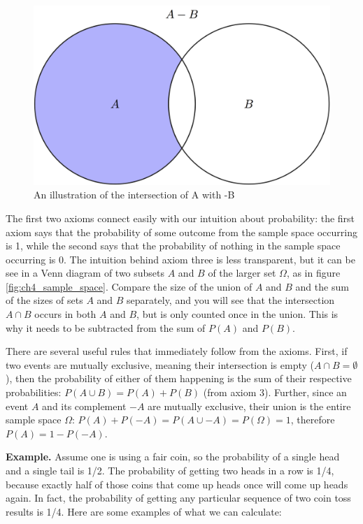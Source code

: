 \documentclass[
  letterpaper,
  DIV=11,
  numbers=noendperiod]{scrreprt}
\begin{document}
\begin{figure}

{\centering \includegraphics{./ch4/set_subtraction.png}

}

\caption{An illustration of the intersection of A with -B}

\end{figure}

The first two axioms connect easily with our intuition about
probability: the first axiom says that the probability of some outcome
from the sample space occurring is 1, while the second says that the
probability of nothing in the sample space occurring is 0. The intuition
behind axiom three is less transparent, but it can be see in a Venn
diagram of two subsets \(A\) and \(B\) of the larger set \(\Omega\), as
in figure \ref{fig:ch4_sample_space}. Compare the size of the union of
\(A\) and \(B\) and the sum of the sizes of sets \(A\) and \(B\)
separately, and you will see that the intersection \(A\cap B\) occurs in
both \(A\) and \(B\), but is only counted once in the union. This is why
it needs to be subtracted from the sum of \(P(A)\) and \(P(B)\).

There are several useful rules that immediately follow from the axioms.
First, if two events are mutually exclusive, meaning their intersection
is empty (\(A\cap B = \emptyset\)), then the probability of either of
them happening is the sum of their respective probabilities:
\(P(A \cup B) = P(A) + P(B)\) (from axiom 3). Further, since an event
\(A\) and its complement \(-A\) are mutually exclusive, their union is
the entire sample space \(\Omega\):
\(P(A) + P(-A) = P(A \cup -A) = P(\Omega) = 1\), therefore
\(P(A) = 1-P(-A)\).

\textbf{Example.} Assume one is using a fair coin, so the probability of
a single head and a single tail is 1/2. The probability of getting two
heads in a row is 1/4, because exactly half of those coins that come up
heads once will come up heads again. In fact, the probability of getting
any particular sequence of two coin toss results is 1/4. Here are some
examples of what we can calculate:
\end{document}
